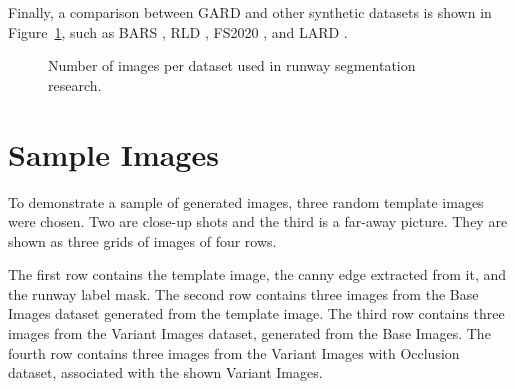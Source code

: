 Finally, a comparison between GARD and other synthetic datasets is shown in
Figure~\ref{fig:dataset_image_counts}, such as BARS \cite{chen_bars_2023},
RLD \cite{wang_valnet_2024}, FS2020 \cite{chen_image-based_2024}, and LARD
\cite{ducoffe_lard_2023}.

\begin{figure}[htbp]
\centering
{}
\caption{Number of images per dataset used in runway segmentation research.}
\label{fig:dataset_image_counts}
\end{figure}



\FloatBarrier
\section{Sample Images}

To demonstrate a sample of generated images, three random template images were
chosen. Two are close-up shots and the third is a far-away picture. They
are shown as three grids of images of four rows.

The first row contains the template image, the canny edge extracted from it,
and the runway label mask. The second row contains three images from the Base
Images dataset generated from the template image. The third row contains three
images from the Variant Images dataset, generated from the Base Images. The
fourth row contains three images from the Variant Images with Occlusion dataset,
associated with the shown Variant Images.

